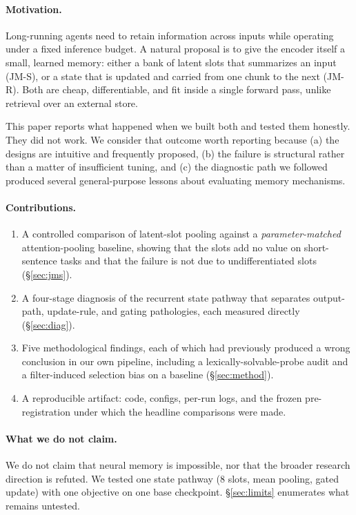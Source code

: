 \documentclass[10pt,twocolumn,letterpaper]{article}
\begin{document}
\paragraph{Motivation.} Long-running agents need to retain information across
inputs while operating under a fixed inference budget. A natural proposal is to
give the encoder itself a small, learned memory: either a bank of latent slots
that summarizes an input (JM-S), or a state that is updated and carried from
one chunk to the next (JM-R). Both are cheap, differentiable, and fit inside a
single forward pass, unlike retrieval over an external store.

This paper reports what happened when we built both and tested them honestly.
They did not work. We consider that outcome worth reporting because (a) the
designs are intuitive and frequently proposed, (b) the failure is structural
rather than a matter of insufficient tuning, and (c) the diagnostic path we
followed produced several general-purpose lessons about evaluating memory
mechanisms.

\paragraph{Contributions.}
\begin{enumerate}[leftmargin=1.4em,itemsep=1pt,topsep=2pt]
\item A controlled comparison of latent-slot pooling against a
\emph{parameter-matched} attention-pooling baseline, showing that the slots add
no value on short-sentence tasks and that the failure is not due to
undifferentiated slots (\S\ref{sec:jms}).
\item A four-stage diagnosis of the recurrent state pathway that separates
output-path, update-rule, and gating pathologies, each measured directly
(\S\ref{sec:diag}).
\item Five methodological findings, each of which had previously produced a
wrong conclusion in our own pipeline, including a lexically-solvable-probe
audit and a filter-induced selection bias on a baseline (\S\ref{sec:method}).
\item A reproducible artifact: code, configs, per-run logs, and the frozen
pre-registration under which the headline comparisons were made.
\end{enumerate}

\paragraph{What we do not claim.} We do not claim that neural memory is
impossible, nor that the broader research direction is refuted. We tested one
state pathway (8 slots, mean pooling, gated update) with one objective on one
base checkpoint. \S\ref{sec:limits} enumerates what remains untested.
\end{document}
